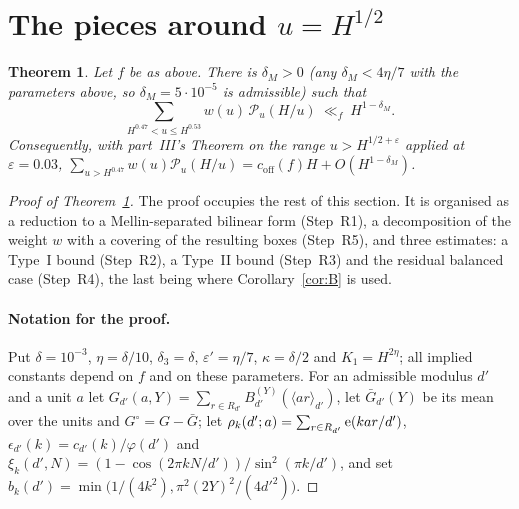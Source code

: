 \documentclass[11pt,a4paper]{article}
\newtheorem{theorem}{Theorem}\newtheorem{proposition}[theorem]{Proposition}\newtheorem{lemma}[theorem]{Lemma}
\begin{document}
\section{The pieces around $u=H^{1/2}$}
\begin{theorem}\label{thm:M}
Let $f$ be as above. There is $\delta_M>0$ (any $\delta_M<4\eta/7$ with the parameters above, so $\delta_M=5\cdot10^{-5}$ is admissible) such that
\[
\sum_{H^{0.47}<u\le H^{0.53}}w(u)\,\mathcal P_u(H/u)\ \ll_f\ H^{1-\delta_M}.
\]
Consequently, with part~III's Theorem on the range $u>H^{1/2+\varepsilon}$ applied at $\varepsilon=0.03$,
$\sum_{u>H^{0.47}}w(u)\mathcal P_u(H/u)=c_{\mathrm{off}}(f)H+O(H^{1-\delta_M})$.
\end{theorem}
\begin{proof}[Proof of Theorem~\ref{thm:M}] The proof occupies the rest of this section. It is organised as a reduction to a Mellin-separated bilinear form
(Step~R1), a decomposition of the weight $w$ with a covering of the resulting boxes (Step~R5), and three estimates: a Type~I bound (Step~R2), a Type~II bound (Step~R3) and the
residual balanced case (Step~R4), the last being where Corollary~\ref{cor:B} is used.
\paragraph{Notation for the proof.} Put $\delta=10^{-3}$, $\eta=\delta/10$, $\delta_3=\delta$, $\varepsilon'=\eta/7$, $\kappa=\delta/2$ and $K_1=H^{2\eta}$; all implied constants
depend on $f$ and on these parameters. For an admissible modulus $d'$ and a unit $a$ let $G_{d'}(a,Y)=\sum_{r\in R_{d'}}B^{(Y)}_{d'}(\langle ar\rangle_{d'})$, let $\bar G_{d'}(Y)$ be
its mean over the units and $G^\circ=G-\bar G$; let $\rho_k(d';a)=\sum_{r\in R_{d'}}\mathrm{e}(kar/d')$, $\epsilon_{d'}(k)=c_{d'}(k)/\varphi(d')$ and
$\xi_k(d',N)=(1-\cos(2\pi kN/d'))/\sin^2(\pi k/d')$, and set $b_k(d')=\min\bigl(1/(4k^2),\pi^2(2Y)^2/(4d'^2)\bigr)$.


\end{proof}
\end{document}
